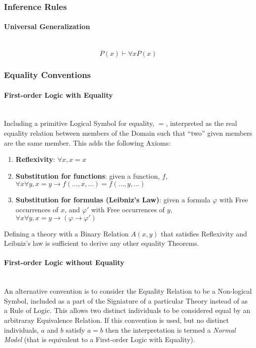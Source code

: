 \subsubsection{Inference Rules}

\paragraph{Universal Generalization}\label{sec:universal_generalization} \hfill
\\
\[P(x) \vdash \forall x P(x)\]

\subsubsection{Equality Conventions}\label{sec:firstorder_equality}

\paragraph{First-order Logic with Equality}\hfill
\\ Including a primitive Logical Symbol for equality, $=$, interpreted
as the real equality relation between members of the Domain such that
``two'' given members are the same member. This adds the following
Axioms:

\begin{enumerate}
\item \textbf{Reflexivity}: $\forall x, x=x$
\item \textbf{Substitution for functions}: given a function, $f$,
  $\forall x \forall y, x = y \rightarrow f(\ldots,x,\ldots) =
  f(\ldots,y,\ldots)$
\item \textbf{Substitution for formulas (Leibniz's Law)}: given a
  formula $\varphi$ with Free occurrences of $x$, and $\varphi '$ with
  Free occurrences of $y$, $\forall x \forall y, x = y \rightarrow
  (\varphi \rightarrow \varphi ')$
\end{enumerate}

Defining a theory with a Binary Relation $A(x,y)$ that satisfies
Reflexivity and Leibniz's law is sufficient to derive any other
equality Theorems.

\paragraph{First-order Logic without Equality} \hfill
\\ An alternative convention is to consider the Equality Relation to
be a Non-logical Symbol, included as a part of the Signiature of a
particular Theory instead of as a Rule of Logic. This allows two
distinct individuals to be considered equal by an arbitraray
Equivalence Relation. If this convention is used, but no distinct
individuals, $a$ and $b$ satisfy $a=b$ then the interpretation is
termed a \emph{Normal Model} (that is equivalent to a First-order
Logic with Equality).


